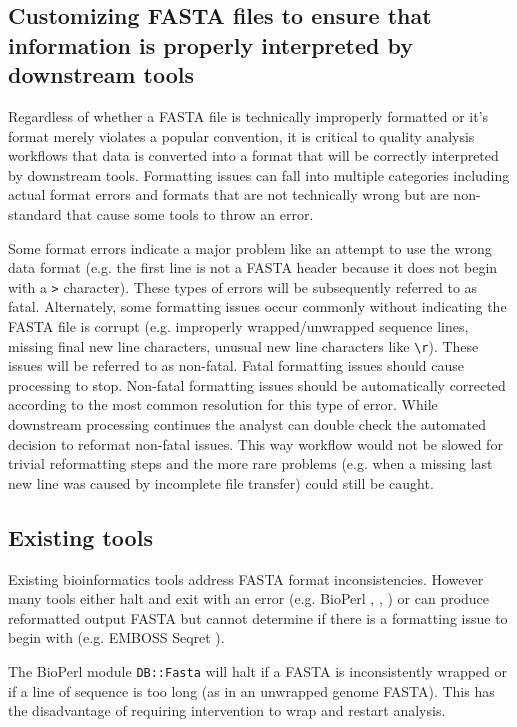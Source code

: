 \subsection{Customizing FASTA files to ensure that information is properly interpreted by downstream tools}

Regardless of whether a FASTA file is technically improperly formatted or it's format merely violates a popular convention, it is critical to quality analysis workflows that data is converted into a format that will be correctly interpreted by downstream tools. Formatting issues can fall into multiple categories including actual format errors and formats that are not technically wrong but are non-standard that cause some tools to throw an error. 

Some format errors indicate a major problem like an attempt to use the wrong data format (e.g. the first line is not a FASTA header because it does not begin with a \verb|>| character). These types of errors will be subsequently referred to as fatal. Alternately, some formatting issues occur commonly without indicating the FASTA file is corrupt (e.g. improperly wrapped/unwrapped sequence lines, missing final new line characters, unusual new line characters like \verb|\r|). These issues will be referred to as non-fatal. Fatal formatting issues should cause processing to stop. Non-fatal formatting issues should be automatically corrected according to the most common resolution for this type of error. While downstream processing continues the analyst can double check the automated decision to reformat non-fatal issues. This way workflow would not be slowed for trivial reformatting steps and the more rare problems (e.g. when a missing last new line was caused by incomplete file transfer) could still be caught.
  
\subsection{Existing tools}

Existing bioinformatics tools address FASTA format inconsistencies. However many tools either halt and exit with an error (e.g. BioPerl \cite{bioperl}, \cite{bioperl2}, \cite{bioperl3}) or can produce reformatted output FASTA but cannot determine if there is a formatting issue to begin with (e.g. EMBOSS Seqret \cite{PMID:10827456}). 

The BioPerl module \verb|DB::Fasta| will halt if a FASTA is inconsistently wrapped or if a line of sequence is too long (as in an unwrapped genome FASTA). This has the disadvantage of requiring intervention to wrap and restart analysis.

